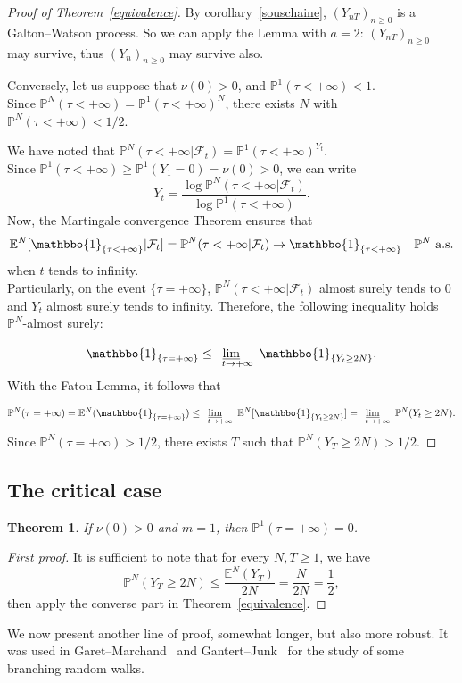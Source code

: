 \documentclass[svgnames]{amsart}
\newcommand{\E}{\ensuremath{\mathbb{E}}}
\renewcommand{\P}{\ensuremath{\mathbb{P}}}
\renewcommand{\liminf}{\underline{\lim}\quad}
\newcommand{\miniop}[3]{%
\renewcommand{\arraystretch}{0.6}
\begin{array}{c}
{\scriptstyle #1}\\
#2\\
{\scriptstyle #3}
\end{array}
\renewcommand{\arraystretch}{1}}
\newcommand{\1}{\mathbbo{1}}
\newtheorem{theo}{Theorem}
\begin{document}
\begin{proof}[Proof of Theorem~\ref{equivalence}]
By corollary~\ref{souschaine}, $(Y_{nT})_{n\ge 0}$ is a Galton--Watson process. So we can apply the Lemma with $a=2$: $(Y_{nT})_{n\ge 0}$ may survive, thus  $(Y_{n})_{n\ge 0}$ may survive also.


Conversely, let us suppose that $\nu(0)>0$, and $\P^1(\tau<+\infty)<1$.\\
Since $\P^N(\tau<+\infty)=\P^1(\tau<+\infty)^N$, there exists $N$ with $\P^N(\tau<+\infty)<1/2$.


We have noted that $\P^N(\tau<+\infty|\mathcal{F}_t)=\P^1(\tau<+\infty)^{Y_t}$.\\
Since $\P^1(\tau<+\infty)\ge \P^1(Y_1=0)=\nu(0)>0$, we can write
$$Y_t=\frac{\log \P^N(\tau<+\infty|\mathcal{F}_t)}{\log \P^1(\tau<+\infty)}.$$
Now, the Martingale convergence Theorem ensures that
$$\E^N[\1_{\{\tau<+\infty\}}|\mathcal{F}_t]=\P^N(\tau<+\infty|\mathcal{F}_t)\to \1_{\{\tau<+\infty\}}\quad\P^N\text{ a.s.}$$ when $t$ tends to infinity. \\
Particularly, on the event $\{\tau=+\infty\}$, 
$\P^N(\tau<+\infty|\mathcal{F}_t)$ almost surely tends to  $0$ and
$Y_t$ almost surely tends to infinity. Therefore, the following inequality holds $\P^N$-almost surely:
$$\1_{\{\tau=+\infty\}}\le \miniop{}{\liminf}{t\to +\infty}\1_{\{Y_t\ge 2N\}}.$$
With the Fatou Lemma, it follows that
$$\P^N(\tau=+\infty)=\E^N(\1_{\{\tau=+\infty\}})\le \miniop{}{\liminf}{t\to +\infty}\E^N[\1_{\{Y_t\ge 2N\}}]= \miniop{}{\liminf}{t\to +\infty}\P^N(Y_t\ge 2N).$$
Since $\P^N(\tau=+\infty)>1/2$, there exists $T$ such that $\P^N(Y_T\ge 2N)>1/2$.
\end{proof}

\subsection{The critical case}

\begin{theo}
  If $\nu(0)>0$ and $m=1$, then $\P^1(\tau=+\infty)=0$.
\end{theo}

\begin{proof}[First proof]
It is sufficient to note that for every $N,T\ge 1$, we have $$\P^N(Y_T\ge 2N)\le\frac{\E^N(Y_T)}{2N}=\frac{N}{2N}=\frac12,$$
then apply the converse part in Theorem~\ref{equivalence}.
\end{proof}
We now present another line of proof, somewhat longer, but also more robust.
It was used in Garet--Marchand~\cite{GM-BRW} and Gantert--Junk~\cite{Gantert} for the study of some branching random walks.
\end{document}
